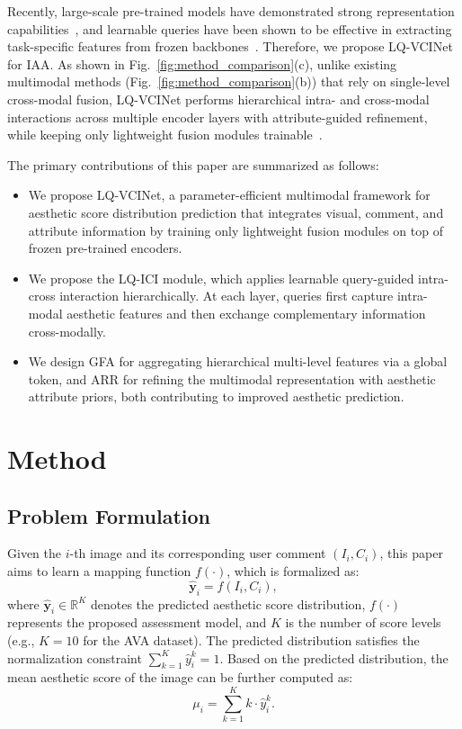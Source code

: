 \documentclass[journal]{IEEEtran}
\begin{document}
Recently, large-scale pre-trained models have demonstrated strong representation capabilities~\cite{dosovitskiy2021vit,li2022blip,li2023blip2}, and learnable queries have been shown to be effective in extracting task-specific features from frozen backbones~\cite{xiong2023iaalq,xiong2024mmlq}. Therefore, we propose LQ-VCINet for IAA. As shown in Fig.~\ref{fig:method_comparison}(c), unlike existing multimodal methods (Fig.~\ref{fig:method_comparison}(b)) that rely on single-level cross-modal fusion, LQ-VCINet performs hierarchical intra- and cross-modal interactions across multiple encoder layers with attribute-guided refinement, while keeping only lightweight fusion modules trainable~\cite{zhou2022coop,jia2022vpt,hu2022lora}.

The primary contributions of this paper are summarized as follows:
\begin{itemize}
\item We propose LQ-VCINet, a parameter-efficient multimodal framework for aesthetic score distribution prediction that integrates visual, comment, and attribute information by training only lightweight fusion modules on top of frozen pre-trained encoders.
\item We propose the LQ-ICI module, which applies learnable query-guided intra-cross interaction hierarchically. At each layer, queries first capture intra-modal aesthetic features and then exchange complementary information cross-modally.
\item We design GFA for aggregating hierarchical multi-level features via a global token, and ARR for refining the multimodal representation with aesthetic attribute priors, both contributing to improved aesthetic prediction.
\end{itemize}

\section{Method}

\subsection{Problem Formulation}

Given the $i$-th image and its corresponding user comment $(I_i,C_i)$, this paper aims to learn a mapping function $f(\cdot)$, which is formalized as:
\begin{equation}
\hat{\mathbf{y}}_i=f(I_i,C_i),
\end{equation}
where $\hat{\mathbf{y}}_i\in\mathbb{R}^{K}$ denotes the predicted aesthetic score distribution, $f(\cdot)$ represents the proposed assessment model, and $K$ is the number of score levels (e.g., $K=10$ for the AVA dataset). The predicted distribution satisfies the normalization constraint $\sum_{k=1}^{K}\hat{y}_i^k=1$. Based on the predicted distribution, the mean aesthetic score of the image can be further computed as:
\begin{equation}
\label{eq:mean_score}
\mu_i=\sum_{k=1}^{K}k\cdot\hat{y}_i^k.
\end{equation}
\end{document}
